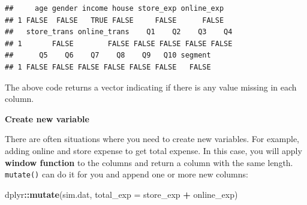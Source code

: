 \documentclass[12pt,]{krantz}
\newenvironment{Shaded}{\begin{snugshade}}{\end{snugshade}}
\newcommand{\KeywordTok}[1]{\textcolor[rgb]{0.13,0.29,0.53}{\textbf{#1}}}
\newcommand{\DataTypeTok}[1]{\textcolor[rgb]{0.13,0.29,0.53}{#1}}
\newcommand{\StringTok}[1]{\textcolor[rgb]{0.31,0.60,0.02}{#1}}
\newcommand{\OperatorTok}[1]{\textcolor[rgb]{0.81,0.36,0.00}{\textbf{#1}}}
\newcommand{\NormalTok}[1]{#1}
\theoremstyle{definition}
\theoremstyle{definition}
\theoremstyle{definition}
\theoremstyle{remark}
\begin{document}
\begin{verbatim}
##     age gender income house store_exp online_exp
## 1 FALSE  FALSE   TRUE FALSE     FALSE      FALSE
##   store_trans online_trans    Q1    Q2    Q3    Q4
## 1       FALSE        FALSE FALSE FALSE FALSE FALSE
##      Q5    Q6    Q7    Q8    Q9   Q10 segment
## 1 FALSE FALSE FALSE FALSE FALSE FALSE   FALSE
\end{verbatim}

The above code returns a vector indicating if there is any value missing
in each column.

\textbf{Create new variable}

There are often situations where you need to create new variables. For
example, adding online and store expense to get total expense. In this
case, you will apply \textbf{window function} to the columns and return
a column with the same length. \texttt{mutate()} can do it for you and
append one or more new columns:

\begin{Shaded}
\begin{Highlighting}[]
\NormalTok{dplyr}\OperatorTok{::}\KeywordTok{mutate}\NormalTok{(sim.dat, }\DataTypeTok{total_exp =}\NormalTok{ store_exp }\OperatorTok{+}\StringTok{ }\NormalTok{online_exp)}
\end{Highlighting}
\end{Shaded}
\end{document}

